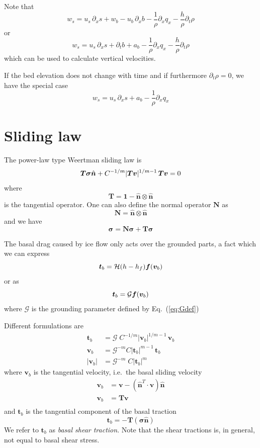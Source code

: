 \documentclass[10pt,a4paper]{book}
\newcommand{\He}{\mathcal{H}}
\newcommand{\G}{\mathcal{G}}
\newcommand{\p}{\partial}
\newcommand{\normal}{\hat{\bm{n}}}
\begin{document}
Note that
\[
w_s = u_s \, \p_x s +w_b - u_b \, \p_x b - \frac{1}{\rho} \p_x q_x - \frac{h}{\rho} \p_t \rho 
\]
or
\[
w_s = u_s \, \p_x s + \p_t b + a_b  - \frac{1}{\rho} \p_x q_x - \frac{h}{\rho} \p_t \rho 
\]
which can be used to calculate vertical velocities. 

If the bed elevation does not change with time and if furthermore
$\p_t \rho=0$, we have the special case
\[
w_s = u_s \, \p_x s + a_b  - \frac{1}{\rho} \p_x q_x 
\]



\section{Sliding law}
The power-law type Weertman sliding law is
\[
\bm{T} \bm{\sigma} \normal  + C^{-1/m} |\bm{T} \bm{v}|^{1/m-1} \, \bm{T} \bm{v} =0 \\
\]
where 
\[ 
\bm{T}= \bm{1} - \normal \otimes \normal
\]
is the tangential operator.  One can also define the normal operator $\bm{N}$ as
\[
\bm{N}= \normal \otimes \normal
\]
and we have
\[
\bm{\sigma}= \bm{N} \bm{\sigma} + \bm{T} \bm{\sigma}
\]

The basal drag caused by ice flow only acts over the grounded parts, a
fact which we can express
\[
\bm{t}_b  = \He(h-h_f) \bm{f}(\bm{v}_b)\\
\]
or as
\[
\bm{t}_b  = \G \bm{f}(\bm{v}_b)\\
\]
where
$\G$ is the grounding parameter defined by Eq.~(\ref{eq:Gdef})


Different formulations are
\begin{align}
\bm{t}_b  & = \G \; C^{-1/m} | \bm{v}_b|^{1/m-1} \, \bm{v}_b \label{eq:slida} \\
\bm{v}_b  & = \G^{-m} C | \bm{t}_b|^{m-1} \, \bm{t}_b \label{eq:slidb} \\
|\bm{v}_b|& = \G^{-m} \; C  | \bm{t}_b|^{m}  \label{eq:slidc}
\end{align}
where
$\bm{v}_b$ is the tangential velocity, i.e.\ the basal sliding velocity
\begin{align*}
\bm{v}_b&=\bm{v}-(\normal^T \cdot \bm{v}) \normal \\
\bm{v}_b&=\bm{T} \bm{v} \\
\end{align*}
and $\bm{t}_b$ is the tangential component of the basal traction
\[
\bm{t}_b = -\bm{T} (\bm{\sigma}  \normal)
\]
We refer to $\bm{t}_b$ as {\em basal shear traction}.  Note that the
shear tractions is, in general, not equal to basal shear stress.
\end{document}
